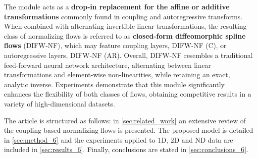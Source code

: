 The module acts as a \textbf{drop-in replacement for the affine or additive transformations} commonly found in coupling and autoregressive transforms. 
When combined with alternating invertible linear transformations, the resulting class of normalizing flows is referred to as \textbf{closed-form diffeomorphic spline flows} (DIFW-NF), which may feature coupling layers, DIFW-NF (C), or autoregressive layers, DIFW-NF (AR).
Overall, DIFW-NF resembles a traditional feed-forward neural network architecture, alternating between linear transformations and element-wise non-linearities, while retaining an exact, analytic inverse.
Experiments demonstrate that this module significantly enhances the flexibility of both classes of flows, obtaining competitive results in a variety of high-dimensional datasets.

The article is structured as follows: 
in \cref{sec:related_work} an extensive review of the coupling-based normalizing flows is presented. The proposed model is detailed in \cref{sec:method_6} and the experiments applied to 1D, 2D and ND data are included in \cref{sec:results_6}. Finally, conclusions are stated in \cref{sec:conclusions_6}.


